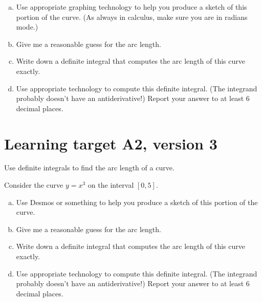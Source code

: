 \begin{enumerate}[(a)]
	\item Use appropriate graphing technology to help you produce a sketch of this portion of the curve. (As always in calculus, make sure you are in radians mode.) 

	\vfill
	\vfill
	
	\item Give me a reasonable guess for the arc length.

	\vfill

	\item Write down a definite integral that computes the arc length of this curve exactly.

	\vfill
	
	\item Use appropriate technology to compute this definite integral. (The integrand probably doesn't have an antiderivative!) Report your answer to at least 6 decimal places. 
	\vfill
\end{enumerate}

\pagebreak

\section{Learning target A2, version 3}

Use definite integrals to find the arc length of a curve.

\hrulefill

Consider the curve \(y = x^3\) on the interval \([0,5]\).

\begin{enumerate}[(a)]
	\item Use Desmos or something to help you produce a sketch of this portion of the curve.

	\vfill
	\vfill
	
	\item Give me a reasonable guess for the arc length.

	\vfill

	\item Write down a definite integral that computes the arc length of this curve exactly.

	\vfill
	
	\item Use appropriate technology to compute this definite integral. (The integrand probably doesn't have an antiderivative!) Report your answer to at least 6 decimal places. 
	\vfill
\end{enumerate}

